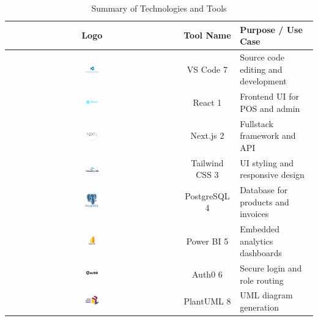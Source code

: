 \begin{table}[H]
\centering
\begin{tabular}{|c|c|p{8cm}|}
\hline
\textbf{Logo} & \textbf{Tool Name} & \textbf{Purpose / Use Case} \\
\hline
\includegraphics[width=0.08\textwidth]{figures/logos/vscode-logo.png} & VS Code {7} & Source code editing and development \\
\hline
\includegraphics[width=0.08\textwidth]{figures/logos/react-logo.png} & React {1} & Frontend UI for POS and admin \\
\hline
\includegraphics[width=0.08\textwidth]{figures/logos/nextjs-logo.png} & Next.js {2} & Fullstack framework and API \\
\hline
\includegraphics[width=0.08\textwidth]{figures/logos/tailwind-logo.png} & Tailwind CSS {3} & UI styling and responsive design \\
\hline
\includegraphics[width=0.08\textwidth]{figures/logos/postgresql-logo.png} & PostgreSQL {4} & Database for products and invoices \\
\hline
\includegraphics[width=0.08\textwidth]{figures/logos/powerbi-logo.png} & Power BI {5} & Embedded analytics dashboards \\
\hline
\includegraphics[width=0.08\textwidth]{figures/logos/auth0-logo.png} & Auth0 {6} & Secure login and role routing \\
\hline
\includegraphics[width=0.08\textwidth]{figures/logos/uml-logo.png} & PlantUML {8} & UML diagram generation \\
\hline
\end{tabular}
\caption{Summary of Technologies and Tools}
\label{tab:tools-summary}
\end{table}

